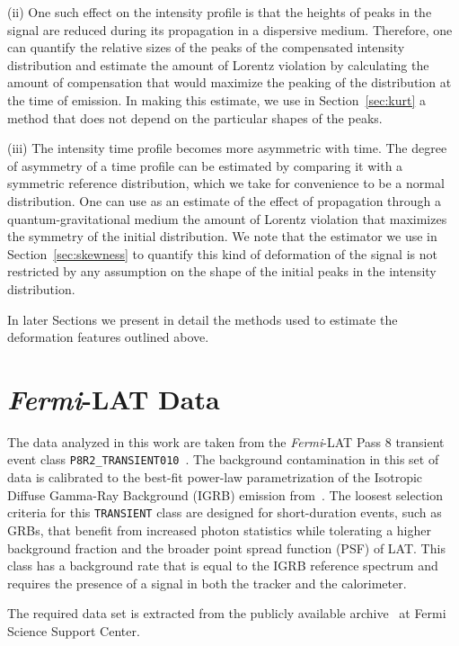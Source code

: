 \documentclass[12pt]{article}
\begin{document}
(ii) One such effect on the intensity profile is that the heights of peaks in the signal are reduced during its propagation in a dispersive medium.
Therefore, one can quantify the relative sizes of the peaks of the compensated intensity distribution and estimate the amount
of Lorentz violation by calculating the amount of compensation that would maximize the peaking of the distribution at the time of emission.
In making this estimate, we use in Section~\ref{sec:kurt} a method that does not depend on the particular shapes
of the peaks.

(iii)  The intensity time profile becomes more asymmetric with time.
The degree of asymmetry of a time profile can be estimated by comparing it with
a symmetric reference distribution, which we take for convenience to be
a normal distribution. One can use as an estimate of the effect of propagation through
a quantum-gravitational medium the amount of Lorentz violation
that maximizes the symmetry of the initial distribution.
We note that the estimator we use in Section~\ref{sec:skewness} to quantify this kind of deformation of the signal
is not restricted by any assumption on the shape of the initial peaks in the intensity distribution.

In later Sections we present in detail the methods used to estimate the deformation features outlined above.

\section{{\it Fermi}-LAT Data}
\label{sec:DataInUse}
The data analyzed in this work are taken from the {\it Fermi}-LAT Pass 8 transient event class
{\tt P8R2{\_}TRANSIENT010}~\cite{fermiLATdata}.
The background contamination in this set of data is calibrated to the best-fit power-law
parametrization of the Isotropic Diffuse Gamma-Ray Background (IGRB) emission from~\cite{Abdo}.
The loosest selection criteria for this {\tt TRANSIENT} class are designed for short-duration events,
such as GRBs, that benefit from increased photon statistics while tolerating a higher
background fraction and the broader point spread function (PSF) of LAT. This class has a background
rate that is equal to the IGRB reference spectrum and requires the presence
of a signal in both the tracker and the calorimeter.

The required data set is extracted from the publicly available archive~\cite{FermiLATarch} at
Fermi Science Support Center.
\end{document}
